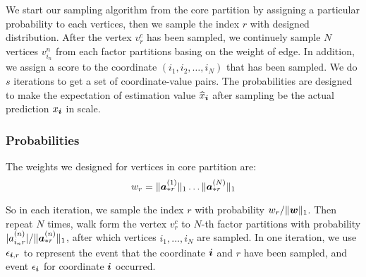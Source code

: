 \documentclass[letterpaper]{article}
\newcommand{\Sca}[3]{{#1}^{(#2)}_{i_#2#3}}%
\newcommand{\anr}[2]{\Sca{a}{#1}{#2}}
\newcommand{\score}[1]{\xi_{\V{i},#1}}
\newcommand{\V}[1]{{\boldsymbol{{\MakeLowercase{#1}}}}}
\newcommand{\VnC}[3]{\V{#1}^{(#2)}_{#3}}
\newcommand{\Nrocl}[2]{\norm{\VnC{a}{#1}{*#2}}{1}}
\newcommand{\Vacol}[1]{\V{a}^{(#1)}_{*r}}
\newcommand{\M}[1]{{\textbf{{\MakeUppercase{#1}}}}}
\newcommand{\norm}[2]{\|#1\|_{#2}}
\newcommand{\Alg}[1] {Algorithm~\ref{alg:#1}}
\newcommand{\AlgLine}[2]{line~\ref{line:#2} of Algorithm~\ref{alg:#1}}
\newcommand{\AlgLines}[3]{lines~\ref{line:#2}--\ref{line:#3} of Algorithm~\ref{alg:#1}}
\newcommand{\coord}{(i_1,i_2,\ldots,i_N)}
\newcommand{\WeightR}{\Nrocl{1}{r}\ldots\Nrocl{N}{r}}
\newcommand{\predx}{\widehat{x}_{\V{i}}}
\begin{document}
We start our sampling algorithm from the core partition
by assigning a particular probability to each vertices,
then we sample the index $r$ with designed distribution.
After the vertex $v^c_r$ has been sampled,
we continuely sample $N$ vertices $v^{n}_{i_n}$ from each factor partitions
basing on the weight of edge.
In addition, we assign a score to the coordinate $\coord$ that has been sampled.
We do $s$ iterations to get a set of coordinate-value pairs.
The probabilities are designed to make the expectation of estimation value $\widehat{x}_\V{i}$ 
after sampling be the actual prediction $x_\V{i}$ in scale.

\subsubsection{Probabilities}
The weights we designed for vertices in core partition are:
\[
    w_r = \WeightR
\]

So in each iteration, we sample the index $r$
with probability $w_r/\norm{\V{w}}{1}$.
Then repeat $N$ times,
walk form the vertex $v^c_r$ to $N$-th factor partitions with probability
$|\anr{n}{r}|/\norm{\Vacol{n}}{1}$,
after which vertices $i_1,\ldots,i_N$ are sampled.
In one iteration, we use $\epsilon_{\V{i},r}$ to represent the event that
the coordinate $\V{i}$ and $r$ have been sampled,
and event $\epsilon_{\V{i}}$ for coordinate $\V{i}$ occurred.
\end{document}
